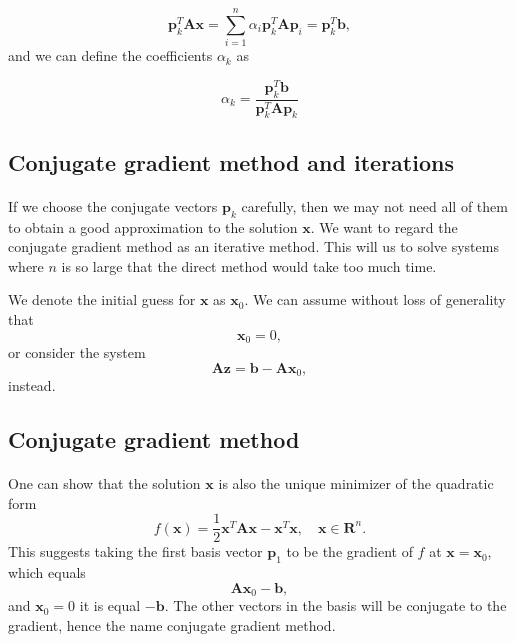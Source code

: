 \documentclass[%
oneside,                 %
final,                   %
10pt]{article}
\begin{document}
\begin{equation*}
  \bm{p}_k^T \bm{A}\bm{x} = \sum^{n}_{i=1} \alpha_i\bm{p}_k^T \bm{A}\bm{p}_i= \bm{p}_k^T \bm{b},
\end{equation*}
and we can define the coefficients $\alpha_k$ as

\begin{equation*}
    \alpha_k = \frac{\bm{p}_k^T \bm{b}}{\bm{p}_k^T \bm{A} \bm{p}_k}
\end{equation*}



\subsection{Conjugate gradient method and iterations}

\paragraph{}

If we choose the conjugate vectors $\bm{p}_k$ carefully, 
then we may not need all of them to obtain a good approximation to the solution 
$\bm{x}$. 
We want to regard the conjugate gradient method as an iterative method. 
This will us to solve systems where $n$ is so large that the direct 
method would take too much time.

We denote the initial guess for $\bm{x}$ as $\bm{x}_0$. 
We can assume without loss of generality that
\begin{equation*}
\bm{x}_0=0,
\end{equation*}
or consider the system
\begin{equation*}
\bm{A}\bm{z} = \bm{b}-\bm{A}\bm{x}_0,
\end{equation*}
instead.




\subsection{Conjugate gradient method}

\paragraph{}
One can show that the solution $\bm{x}$ is also the unique minimizer of the quadratic form
\begin{equation*}
  f(\bm{x}) = \frac{1}{2}\bm{x}^T\bm{A}\bm{x} - \bm{x}^T \bm{x} , \quad \bm{x}\in\mathbf{R}^n. 
\end{equation*}
This suggests taking the first basis vector $\bm{p}_1$ 
to be the gradient of $f$ at $\bm{x}=\bm{x}_0$, 
which equals
\begin{equation*}
\bm{A}\bm{x}_0-\bm{b},
\end{equation*}
and 
$\bm{x}_0=0$ it is equal $-\bm{b}$.
The other vectors in the basis will be conjugate to the gradient, 
hence the name conjugate gradient method.
\end{document}
